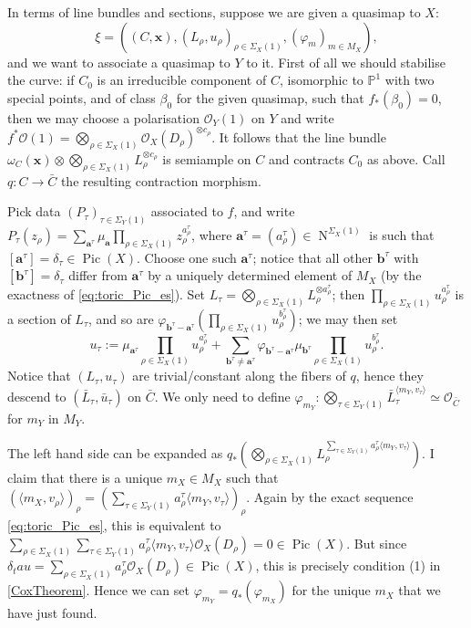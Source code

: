 \documentclass[11pt]{amsart}
\newcommand{\PP}{\mathbb P}
\newcommand{\OO}{\mathcal{O}}
\renewcommand{\to}{\rightarrow}
\newcommand{\Pic}{\operatorname{Pic}}
\newcommand{\NN}{\operatorname{N}}
\theoremstyle{definition}
\theoremstyle{definition}
\begin{document}
In terms of line bundles and sections, suppose we are given a quasimap to $X$: \[\xi=\left( (C,\mathbf x),(L_\rho,u_\rho)_{\rho\in\Sigma_X(1)},(\varphi_m)_{m\in M_X}\right),\]
and we want to associate a quasimap to $Y$ to it. First of all we should stabilise the curve: if $C_0$ is an irreducible component of $C$, isomorphic to $\PP^1$ with two special points, and of class $\beta_0$ for the given quasimap, such that $f_*(\beta_0)=0$, then we may choose a polarisation $\OO_Y(1)$ on $Y$ and write $f^*\OO(1)=\bigotimes_{\rho\in\Sigma_X(1)}\OO_X(D_\rho)^{\otimes c_\rho}$. It follows that the line bundle $\omega_C(\mathbf x)\otimes \bigotimes_{\rho\in\Sigma_X(1)}L_\rho^{\otimes c_\rho}$ is semiample on $C$ and contracts $C_0$ as above. Call $q\colon C\to \bar C$ the resulting contraction morphism.

Pick data $(P_\tau)_{\tau\in\Sigma_Y(1)}$ associated to $f$, and write $P_\tau(z_\rho)=\sum_{\mathbf a^\tau}\mu_{\mathbf a}\prod_{\rho\in\Sigma_X(1)}z_\rho^{a^\tau_\rho}$, where $\mathbf a^\tau=(a^\tau_\rho)\in\NN^{\Sigma_X(1)}$ is such that $[\mathbf a^\tau]=\delta_\tau\in\Pic(X)$. Choose one such $\mathbf a^\tau$; notice that all other $\mathbf b^\tau$ with $[\mathbf b^\tau]=\delta_\tau$ differ from $\mathbf a^\tau$ by a uniquely determined element of $M_X$ (by the exactness of \eqref{eq:toric_Pic_es}). Set $L_\tau=\bigotimes_{\rho\in\Sigma_X(1)}L_\rho^{\otimes a^\tau_\rho}$; then $\prod_{\rho\in\Sigma_X(1)}u_\rho^{a^\tau_\rho}$ is a section of $L_\tau$, and so are $\varphi_{\mathbf b^\tau-\mathbf a^\tau}(\prod_{\rho\in\Sigma_X(1)}u_\rho^{b^\tau_\rho})$; we may then set \[u_\tau:=\mu_{\mathbf a^\tau}\prod_{\rho\in\Sigma_X(1)}u_\rho^{a^\tau_\rho}+\sum_{\mathbf b^\tau\neq \mathbf a^\tau}\varphi_{\mathbf b^\tau-\mathbf a^\tau}\mu_{\mathbf b^\tau}\prod_{\rho\in\Sigma_X(1)}u_\rho^{b^\tau_\rho}.\]
Notice that $(L_\tau,u_\tau)$ are trivial/constant along the fibers of $q$, hence they descend to $(\bar L_\tau,\bar u_\tau)$ on $\bar C$. We only need to define $\varphi_{m_Y}\colon \bigotimes_{\tau\in\Sigma_Y(1)}\bar L_\tau^{\langle m_Y,v_\tau\rangle}\simeq \OO_{\bar C}$ for $m_Y$ in $M_Y$.

The left hand side can be expanded as $q_*\left(\bigotimes_{\rho\in\Sigma_X(1)}L_\rho^{\sum_{\tau\in\Sigma_Y(1)}a^\tau_\rho \langle m_Y,v_\tau\rangle} \right)$. I claim that there is a unique $m_X\in M_X$ such that $(\langle m_X,v_\rho\rangle)_\rho= (\sum_{\tau\in\Sigma_Y(1)}a^\tau_\rho \langle m_Y,v_\tau\rangle)_\rho$. Again by the exact sequence \eqref{eq:toric_Pic_es}, this is equivalent to $\sum_{\rho\in\Sigma_X(1)}\sum_{\tau\in\Sigma_Y(1)}a^\tau_\rho \langle m_Y,v_\tau\rangle\OO_X(D_\rho)=0\in\Pic(X)$. But since $\delta_tau=\sum_{\rho\in\Sigma_X(1)}a^\tau_\rho\OO_X(D_\rho)\in \Pic(X)$, this is precisely condition (1) in \ref{CoxTheorem}. Hence we can set $\varphi_{m_Y}=q_*(\varphi_{m_X})$ for the unique $m_X$ that we have just found.
\end{document}
